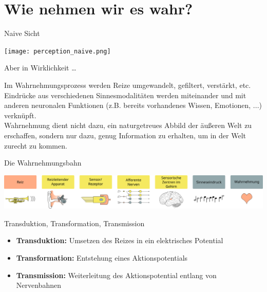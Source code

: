 \documentclass[aspectratio=169]{beamer}
\begin{document}
\section{Wie nehmen wir es wahr?}


\begin{frame}{Naive Sicht}

\begin{center}
    \texttt{[image: perception\_naive.png]}
\end{center}
    
\end{frame}


\begin{frame}{Aber in Wirklichkeit \dots}

Im Wahrnehmungsprozess werden Reize umgewandelt, gefiltert, verstärkt, etc.  Eindrücke aus verschiedenen Sinnesmodalitäten werden miteinander und mit anderen neuronalen Funktionen (z.B. bereits vorhandenes Wissen, Emotionen, ...) verknüpft.  \\[1cm]

Wahrnehmung dient nicht dazu, ein naturgetreues Abbild der äußeren Welt zu erschaffen, sondern nur dazu, genug Information zu erhalten, um in der Welt zurecht zu kommen. 

\end{frame}


\begin{frame}{Die Wahrnehmungsbahn}

\begin{center}
    \includegraphics[width=\textwidth]{wahrnehmungsprozess.png}
\end{center}
    
\end{frame}
 
 
\begin{frame}{Transduktion, Transformation, Transmission}

\begin{itemize}
    \item 
    \textbf{Transduktion: } Umsetzen des Reizes in ein elektrisches Potential
    \item
    \textbf{Transformation: } Entstehung eines Aktionspotentials
    \item 
    \textbf{Transmission: } Weiterleitung des Aktionspotential entlang von Nervenbahnen

\end{itemize}
    
\end{frame}
\end{document}
